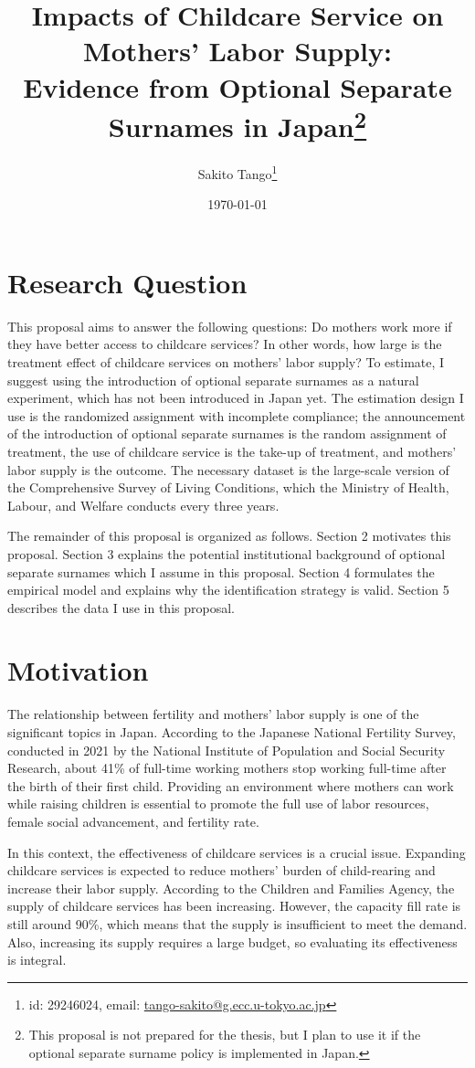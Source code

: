 \documentclass[12pt]{article}
\title{Impacts of Childcare Service on Mothers' Labor Supply: \\ 
       Evidence from Optional Separate Surnames in Japan\thanks{
        This proposal is not prepared for the thesis, but I plan to use it if the optional separate surname policy is implemented in Japan.
       }
       }
\author{Sakito Tango\thanks{id: 29246024, 
        email: \href{mailto:tango-sakito@g.ecc.u-tokyo.ac.jp}{tango-sakito@g.ecc.u-tokyo.ac.jp}
}
}
\date{\today}
\begin{document}
\maketitle

\section{Research Question}
This proposal aims to answer the following questions: Do mothers work more if they have better access to childcare services? 
In other words, how large is the treatment effect of childcare services on mothers' labor supply?
To estimate, I suggest using the introduction of optional separate surnames as a natural experiment, which has not been introduced in Japan yet.
The estimation design I use is the randomized assignment with incomplete compliance; the announcement of the introduction of optional separate surnames is the random assignment of treatment, the use of childcare service is the take-up of treatment, and mothers' labor supply is the outcome.
The necessary dataset is the large-scale version of the Comprehensive Survey of Living Conditions, which the Ministry of Health, Labour, and Welfare conducts every three years.


The remainder of this proposal is organized as follows. 
Section 2 motivates this proposal. 
Section 3 explains the potential institutional background of optional separate surnames which I assume in this proposal.
Section 4 formulates the empirical model and explains why the identification strategy is valid.
Section 5 describes the data I use in this proposal.


\section{Motivation}
The relationship between fertility and mothers' labor supply is one of the significant topics in Japan. 
According to the Japanese National Fertility Survey, conducted in 2021 by the National Institute of Population and Social Security Research, about 41\%  of full-time working mothers stop working full-time after the birth of their first child.
Providing an environment where mothers can work while raising children is essential to promote the full use of labor resources, female social advancement, and fertility rate.


In this context, the effectiveness of childcare services is a crucial issue. 
Expanding childcare services is expected to reduce mothers' burden of child-rearing and increase their labor supply.
According to the Children and Families Agency, the supply of childcare services has been increasing. 
However, the capacity fill rate is still around 90\%, which means that the supply is insufficient to meet the demand.
Also, increasing its supply requires a large budget, so evaluating its effectiveness is integral.
\end{document}
